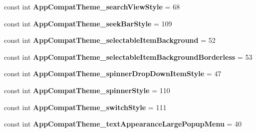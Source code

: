 \begin{DoxyCompactItemize}
\item 
\mbox{\label{class_sample_app_1_1_droid_1_1_resource_1_1_styleable_a288378694f73ab1eea88c514eb165f14}} 
const int {\bfseries App\+Compat\+Theme\+\_\+search\+View\+Style} = 68
\item 
\mbox{\label{class_sample_app_1_1_droid_1_1_resource_1_1_styleable_a0a14216eb8d802d6d9a57b0678d94cca}} 
const int {\bfseries App\+Compat\+Theme\+\_\+seek\+Bar\+Style} = 109
\item 
\mbox{\label{class_sample_app_1_1_droid_1_1_resource_1_1_styleable_a70a4e62ba79cfc11ee1f9219eaad54fd}} 
const int {\bfseries App\+Compat\+Theme\+\_\+selectable\+Item\+Background} = 52
\item 
\mbox{\label{class_sample_app_1_1_droid_1_1_resource_1_1_styleable_a09214d2ca24cc3e2509e7a6cffd83c27}} 
const int {\bfseries App\+Compat\+Theme\+\_\+selectable\+Item\+Background\+Borderless} = 53
\item 
\mbox{\label{class_sample_app_1_1_droid_1_1_resource_1_1_styleable_a12c7fa11395b072298b6e1115dc29924}} 
const int {\bfseries App\+Compat\+Theme\+\_\+spinner\+Drop\+Down\+Item\+Style} = 47
\item 
\mbox{\label{class_sample_app_1_1_droid_1_1_resource_1_1_styleable_ac76c6afa4bfdf60b3f985d92cd1a5609}} 
const int {\bfseries App\+Compat\+Theme\+\_\+spinner\+Style} = 110
\item 
\mbox{\label{class_sample_app_1_1_droid_1_1_resource_1_1_styleable_a8ba84f2f5a54b068a3919be3797009dd}} 
const int {\bfseries App\+Compat\+Theme\+\_\+switch\+Style} = 111
\item 
\mbox{\label{class_sample_app_1_1_droid_1_1_resource_1_1_styleable_a6829efd88b9dd0530279c47e239ba1af}} 
const int {\bfseries App\+Compat\+Theme\+\_\+text\+Appearance\+Large\+Popup\+Menu} = 40

\end{DoxyCompactItemize}
